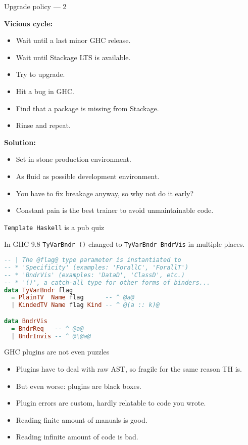 \documentclass[handout]{beamer}
\begin{document}
\begin{frame}{Upgrade policy --- 2}

{\bf Vicious cycle:}
\begin{itemize}[<+->]
  \item Wait until a last minor GHC release.
  \item Wait until Stackage LTS is available.
  \item Try to upgrade.
  \item Hit a bug in GHC.
  \item Find that a package is missing from Stackage.
  \item Rinse and repeat.
\end{itemize}

\bigskip

{\bf Solution:}
\begin{itemize}[<+->]
  \item Set in stone production environment.
  \item As fluid as possible development environment.
  \item You have to fix breakage anyway, so why not do it early?
  \item Constant pain is the best trainer to avoid unmaintainable code.
\end{itemize}

\end{frame}

\begin{frame}[fragile]{{\tt Template Haskell} is a pub quiz}

In GHC 9.8 {\tt TyVarBndr ()} changed
to {\tt TyVarBndr BndrVis} in multiple places.

\bigskip

\begin{lstlisting}[language=Haskell]
-- | The @flag@ type parameter is instantiated to
-- * 'Specificity' (examples: 'ForallC', 'ForallT')
-- * 'BndrVis' (examples: 'DataD', 'ClassD', etc.)
-- * '()', a catch-all type for other forms of binders...
data TyVarBndr flag
  = PlainTV  Name flag      -- ^ @a@
  | KindedTV Name flag Kind -- ^ @(a :: k)@

data BndrVis
  = BndrReq   -- ^ @a@
  | BndrInvis -- ^ @\@a@
\end{lstlisting}

\end{frame}

\begin{frame}{GHC plugins are not even puzzles}

\begin{itemize}[<+->]\itemsep3ex
  \item Plugins have to deal with raw AST, so fragile for the same reason TH is.
  \item But even worse: plugins are black boxes.
  \item Plugin errors are custom, hardly relatable to code you wrote.
  \item Reading finite amount of manuals is good.
  \item Reading infinite amount of code is bad.
\end{itemize}

\end{frame}
\end{document}
